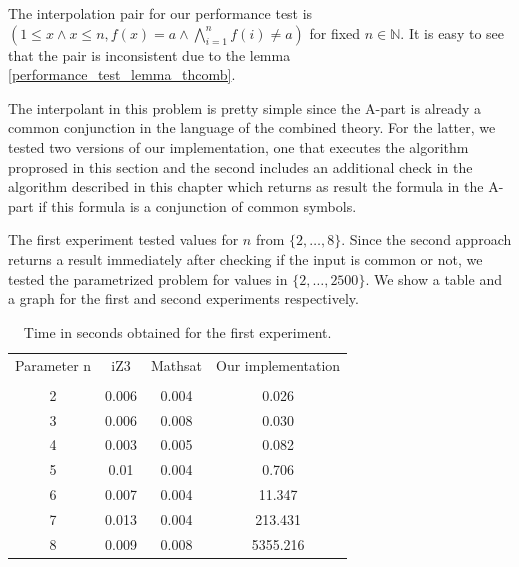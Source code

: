 The interpolation pair for our performance test 
is $(1 \leq x \land x \leq n, 
f(x) = a \land \bigwedge_{i=1}^{n} f(i) \neq a)$
for fixed $n \in \mathbb{N}$.
It is easy to see that the pair is inconsistent due to the lemma 
\ref{performance_test_lemma_thcomb}. 

The interpolant in this problem is pretty simple since the 
A-part is already a common conjunction in the language of the
combined theory. For the latter, we tested two versions of our
implementation, one that executes the algorithm proprosed in
this section and the second includes an additional check in 
the algorithm described in this chapter which returns as result
the formula in the A-part if this formula is a conjunction of 
common symbols.

The first experiment tested values for $n$ from $\{2, \dots, 8\}$.
Since the second approach returns a result immediately after
checking if the input is common or not, we tested the parametrized
problem for values in $\{2, \dots, 2500\}$. We show a table and a
graph for the first and second experiments respectively.

\begin{table}[h]
  \centering
  \begin{tabular}{cccc}
    \toprule
    Parameter n        & iZ3 & Mathsat & Our implementation \\
    \cmidrule{2-4}                                          \\
    2 & 0.006 & 0.004 & 0.026    \\
    3 & 0.006 & 0.008 & 0.030    \\
    4 & 0.003 & 0.005 & 0.082    \\
    5 & 0.01  & 0.004 & 0.706    \\
    6 & 0.007 & 0.004 & 11.347   \\
    7 & 0.013 & 0.004 & 213.431  \\
    8 & 0.009 & 0.008 & 5355.216 \\
    \bottomrule
  \end{tabular}
  \caption{Time in seconds obtained for the first experiment.}
\end{table}

